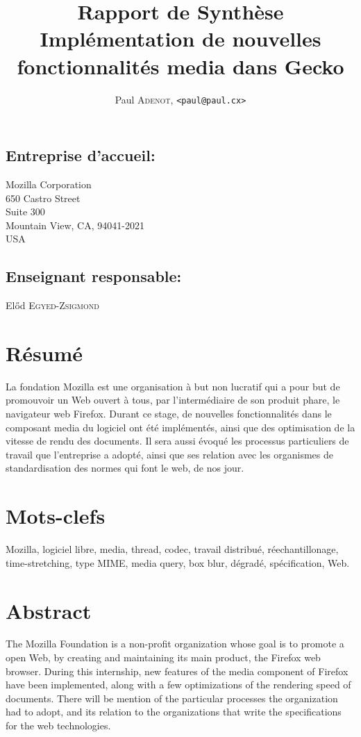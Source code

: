 \documentclass[a4paper,10pt]{article}
\title{\textsf{\textbf{Rapport de Synthèse\\Implémentation de nouvelles
fonctionnalités media dans Gecko}}}
\author{Paul \textsc{Adenot}, \texttt{<paul@paul.cx>}}
\date{}
\begin{document}
\maketitle
\subsection*{Entreprise d'accueil:}
\noindent
Mozilla Corporation\\
650 Castro Street\\
Suite 300\\
Mountain View, CA, 94041-2021\\
USA\\

\subsection*{Enseignant responsable:}
\noindent
Előd \textsc{Egyed-Zsigmond}

\section*{Résumé}
La fondation Mozilla est une organisation à but non lucratif qui a pour but de
promouvoir un Web ouvert à tous, par l'intermédiaire de son produit phare,
le navigateur web Firefox. Durant ce stage, de nouvelles fonctionnalités dans
le composant media du logiciel ont été implémentés, ainsi que des optimisation
de la vitesse de rendu des documents. Il sera aussi évoqué les processus
particuliers de travail que l'entreprise a adopté, ainsi que ses relation avec
les organismes de standardisation des normes qui font le web, de nos jour.

\section*{Mots-clefs}
Mozilla, logiciel libre, media, thread, codec, travail distribué,
réechantillonage, time-stretching, type MIME, media query, box blur, dégradé,
spécification, Web.
\section*{Abstract}
The Mozilla Foundation is a non-profit organization whose goal is to promote a
open Web, by creating and maintaining its main product, the Firefox web browser.
During this internship, new features of the media component of Firefox have been
implemented, along with a few optimizations of the rendering speed of documents.
There will be mention of the particular processes the organization had to adopt,
and its relation to the organizations that write the specifications for the web
technologies.
\end{document}
